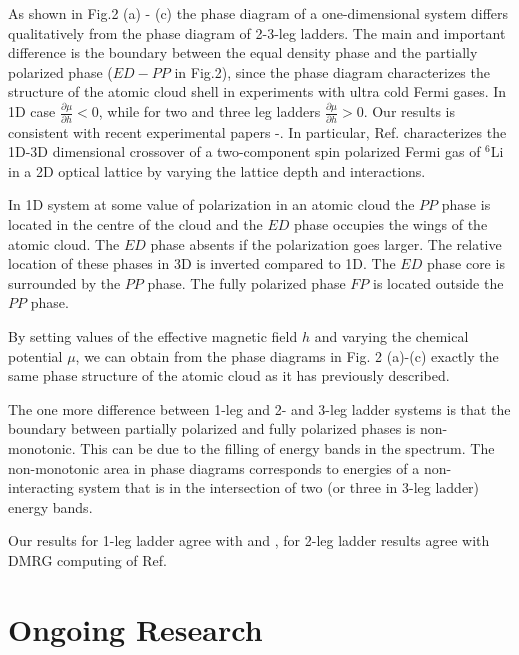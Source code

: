 \documentclass[a0,portrait]{a0poster}
\begin{document}
\begin{multicols}{2}
As shown in Fig.2 (a) - (c) the phase diagram of a one-dimensional system differs qualitatively from the phase diagram of 2-3-leg ladders. The main and important difference is the boundary between the equal density phase and the partially polarized phase ($ED-PP$ in Fig.2), since the phase diagram characterizes the structure of the atomic cloud shell in experiments with ultra cold Fermi gases. In 1D case $\frac{\partial \mu}{\partial h} < 0$, while for two and three leg ladders $\frac{\partial \mu}{\partial h} > 0$. Our results is consistent with recent experimental papers \cite{liao}-\cite{shin}. In particular, Ref. \cite{revelle} characterizes the 1D-3D dimensional crossover of a two-component spin polarized Fermi gas of $ ^{6}$Li in a 2D optical lattice by varying the lattice depth and interactions. 

In 1D system at some value of polarization in an atomic cloud the $PP$ phase is located in the centre of the cloud and the $ED$ phase occupies the wings of the atomic cloud. The $ED$ phase absents if the polarization goes larger. The relative location of these phases in 3D is inverted compared to 1D. The $ED$ phase core is surrounded by the $PP$ phase. The fully polarized phase $FP$ is located outside the $PP$ phase. 

By setting values of the effective magnetic field $h$ and varying the chemical potential $\mu$, we can obtain from the phase diagrams in Fig. 2 (a)-(c) exactly the same phase structure of the atomic cloud as it has previously described.

The one more difference between 1-leg and 2- and 3-leg ladder systems is that the boundary between partially polarized and fully polarized phases is non-monotonic. This can be due to the filling of energy bands in the spectrum. The non-monotonic area in phase diagrams corresponds to energies of a non-interacting system that is in the intersection of two (or three in 3-leg ladder) energy bands.

Our results for 1-leg ladder agree with \cite{oneleg ladder} and \cite{burovski}, for 2-leg ladder results agree with DMRG computing of Ref.\cite{twoleg ladder}

\section*{Ongoing Research}


\end{multicols}
\end{document}

